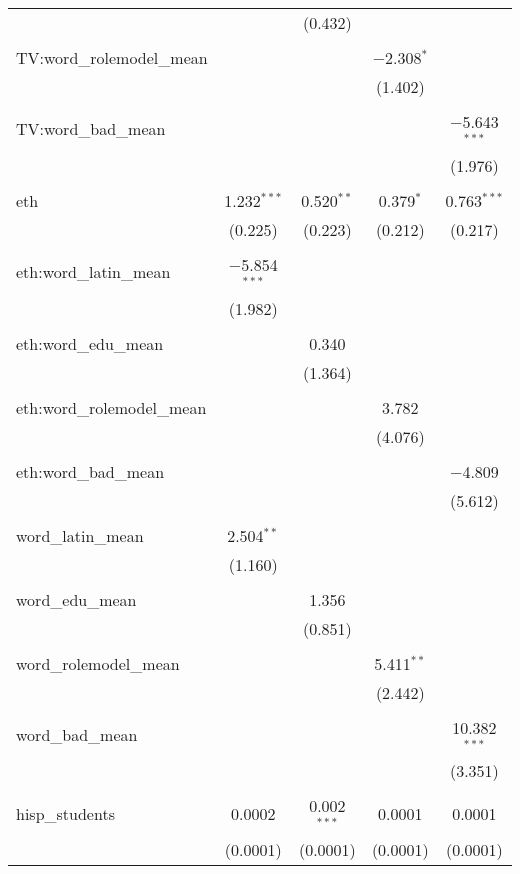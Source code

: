\begin{table}[!htbp]
\begin{tabular}{@{\extracolsep{-2pt}}lcccc}
  &  & (0.432) &  &  \\ 
  & & & & \\ 
 TV:word\_rolemodel\_mean &  &  & $-$2.308$^{*}$ &  \\ 
  &  &  & (1.402) &  \\ 
  & & & & \\ 
 TV:word\_bad\_mean &  &  &  & $-$5.643$^{***}$ \\ 
  &  &  &  & (1.976) \\ 
  & & & & \\ 
 eth & 1.232$^{***}$ & 0.520$^{**}$ & 0.379$^{*}$ & 0.763$^{***}$ \\ 
  & (0.225) & (0.223) & (0.212) & (0.217) \\ 
  & & & & \\ 
 eth:word\_latin\_mean & $-$5.854$^{***}$ &  &  &  \\ 
  & (1.982) &  &  &  \\ 
  & & & & \\ 
 eth:word\_edu\_mean &  & 0.340 &  &  \\ 
  &  & (1.364) &  &  \\ 
  & & & & \\ 
 eth:word\_rolemodel\_mean &  &  & 3.782 &  \\ 
  &  &  & (4.076) &  \\ 
  & & & & \\ 
 eth:word\_bad\_mean &  &  &  & $-$4.809 \\ 
  &  &  &  & (5.612) \\ 
  & & & & \\ 
 word\_latin\_mean & 2.504$^{**}$ &  &  &  \\ 
  & (1.160) &  &  &  \\ 
  & & & & \\ 
 word\_edu\_mean &  & 1.356 &  &  \\ 
  &  & (0.851) &  &  \\ 
  & & & & \\ 
 word\_rolemodel\_mean &  &  & 5.411$^{**}$ &  \\ 
  &  &  & (2.442) &  \\ 
  & & & & \\ 
 word\_bad\_mean &  &  &  & 10.382$^{***}$ \\ 
  &  &  &  & (3.351) \\ 
  & & & & \\ 
 hisp\_students & 0.0002 & 0.002$^{***}$ & 0.0001 & 0.0001 \\ 
  & (0.0001) & (0.0001) & (0.0001) & (0.0001) \\ 

\end{tabular}
\end{table}
